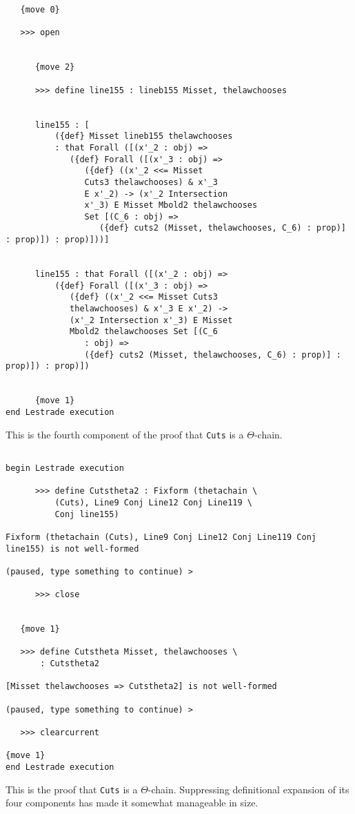\documentclass[12pt]{article}
\begin{document}
\begin{verbatim}
   {move 0}

   >>> open


      {move 2}

      >>> define line155 : lineb155 Misset, thelawchooses


      line155 : [
          ({def} Misset lineb155 thelawchooses 
          : that Forall ([(x'_2 : obj) => 
             ({def} Forall ([(x'_3 : obj) => 
                ({def} ((x'_2 <<= Misset 
                Cuts3 thelawchooses) & x'_3 
                E x'_2) -> (x'_2 Intersection 
                x'_3) E Misset Mbold2 thelawchooses 
                Set [(C_6 : obj) => 
                   ({def} cuts2 (Misset, thelawchooses, C_6) : prop)] : prop)]) : prop)]))]


      line155 : that Forall ([(x'_2 : obj) => 
          ({def} Forall ([(x'_3 : obj) => 
             ({def} ((x'_2 <<= Misset Cuts3 
             thelawchooses) & x'_3 E x'_2) -> 
             (x'_2 Intersection x'_3) E Misset 
             Mbold2 thelawchooses Set [(C_6 
                : obj) => 
                ({def} cuts2 (Misset, thelawchooses, C_6) : prop)] : prop)]) : prop)])


      {move 1}
end Lestrade execution
\end{verbatim}

This is the fourth component of the proof that {\tt Cuts} is a $\Theta$-chain.

\begin{verbatim}

begin Lestrade execution

      >>> define Cutstheta2 : Fixform (thetachain \
          (Cuts), Line9 Conj Line12 Conj Line119 \
          Conj line155)

Fixform (thetachain (Cuts), Line9 Conj Line12 Conj Line119 Conj line155) is not well-formed

(paused, type something to continue) >

      >>> close


   {move 1}

   >>> define Cutstheta Misset, thelawchooses \
       : Cutstheta2

[Misset thelawchooses => Cutstheta2] is not well-formed

(paused, type something to continue) >

   >>> clearcurrent

{move 1}
end Lestrade execution
\end{verbatim}

This is the proof that {\tt Cuts} is a $\Theta$-chain.  Suppressing definitional expansion of its four components has made it somewhat manageable in size.
\end{document}
